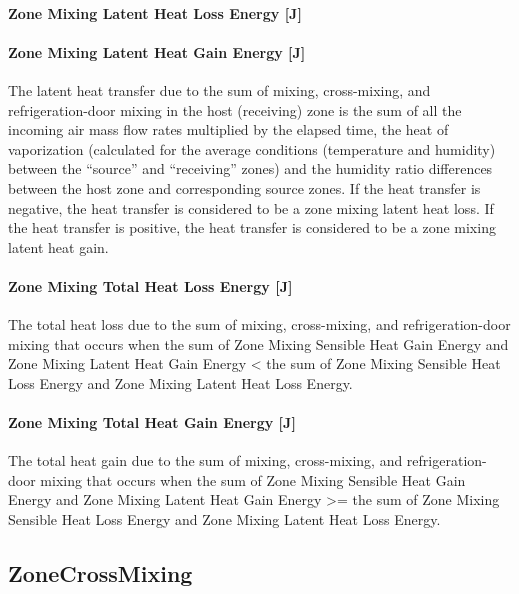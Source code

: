 \paragraph{Zone Mixing Latent Heat Loss Energy {[}J{]}}\label{zone-mixing-latent-heat-loss-energy-j}

\paragraph{Zone Mixing Latent Heat Gain Energy {[}J{]}}\label{zone-mixing-latent-heat-gain-energy-j}

The latent heat transfer due to the sum of mixing, cross-mixing, and refrigeration-door mixing in the host (receiving) zone is the sum of all the incoming air mass flow rates multiplied by the elapsed time, the heat of vaporization (calculated for the average conditions (temperature and humidity) between the ``source'' and ``receiving'' zones) and the humidity ratio differences between the host zone and corresponding source zones. If the heat transfer is negative, the heat transfer is considered to be a zone mixing latent heat loss. If the heat transfer is positive, the heat transfer is considered to be a zone mixing latent heat gain.

\paragraph{Zone Mixing Total Heat Loss Energy {[}J{]}}\label{zone-mixing-total-heat-loss-energy-j}

The total heat loss due to the sum of mixing, cross-mixing, and refrigeration-door mixing that occurs when the sum of Zone Mixing Sensible Heat Gain Energy and Zone Mixing Latent Heat Gain Energy \textless{} the sum of Zone Mixing Sensible Heat Loss Energy and Zone Mixing Latent Heat Loss Energy.

\paragraph{Zone Mixing Total Heat Gain Energy {[}J{]}}\label{zone-mixing-total-heat-gain-energy-j}

The total heat gain due to the sum of mixing, cross-mixing, and refrigeration-door mixing that occurs when the sum of Zone Mixing Sensible Heat Gain Energy and Zone Mixing Latent Heat Gain Energy \textgreater{}= the sum of Zone Mixing Sensible Heat Loss Energy and Zone Mixing Latent Heat Loss Energy.

\subsection{ZoneCrossMixing}\label{zonecrossmixing}

